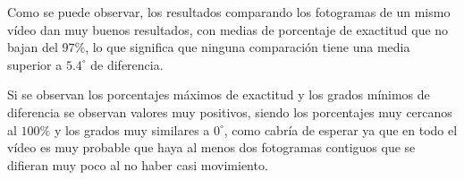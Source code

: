 {\begin{table}[h]
	\centering
\caption{Tabla con los tiempos de la ejecución.}
\label{tab:tiempos}
\end{table}

Como se puede observar, los resultados comparando los fotogramas de un mismo vídeo dan muy buenos resultados, con medias de porcentaje de exactitud que no bajan del $97\%$, lo que significa que ninguna comparación tiene una media superior a $5.4^{\circ}$ de diferencia.

Si se observan los porcentajes máximos de exactitud y los grados mínimos de diferencia se observan valores muy positivos, siendo los porcentajes muy cercanos al $100\%$ y los grados muy similares a $0^{\circ}$, como cabría de esperar ya que en todo el vídeo es muy probable que haya al menos dos fotogramas contiguos que se difieran muy poco al no haber casi movimiento.

}
